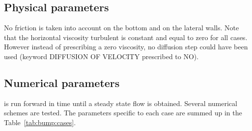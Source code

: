 \subsection{Physical parameters}

No friction is taken into account on the bottom and on the lateral walls.
Note that the horizontal viscosity turbulent is constant and equal to zero for all cases.
However instead of prescribing a zero viscosity, no diffusion step could
have been used (keyword DIFFUSION OF VELOCITY prescribed to NO).

\subsection{Numerical parameters}

 is run forward in time until a steady state flow is obtained. 
Several numerical schemes are tested.
The parameters specific to each case are summed up in the Table~\ref{tab:bump:cases}.

\begin{table}[H]
  \caption{List of the simulation parameters used for the cases tested in the bump example.}
  \label{tab:bump:cases}
\end{table}

